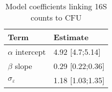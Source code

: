 \begin{table}

\caption{\label{tab:}Model coefficients linking 16S counts to CFU}
\centering
\begin{tabular}[t]{ll}
\toprule
Term & Estimate\\
\midrule
$\alpha$ intercept & 4.92 [4.7;5.14]\\
$\beta$ slope & 0.29 [0.22;0.36]\\
$\sigma_{\varepsilon}$ & 1.18 [1.03;1.35]\\
\bottomrule
\end{tabular}
\end{table}